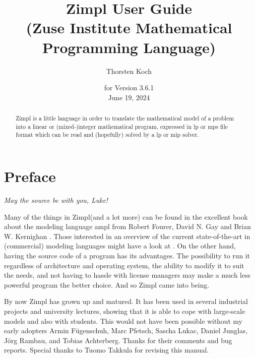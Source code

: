 \documentclass[11pt]{article}
\newcommand{\zimpl}{{\sc Zimpl}\xspace}
\newcommand{\lp}{{\sc lp}\xspace}
\newcommand{\mip}{{\sc mip}\xspace}
\newcommand{\mps}{{\sc mps}\xspace}
\newcommand{\lpf}{{\sc lp}\xspace}
\newcommand{\ampl}{{\sc ampl}\xspace}
\begin{document}

\title{
\LARGE\zimpl User Guide\\
\normalsize (Zuse Institute Mathematical Programming Language)}
\author{Thorsten Koch}
\date{\small for Version 3.6.1\\ June 19, 2024}
\maketitle
%
\tableofcontents
\newpage
\begin{abstract}
  \zimpl is a little language in order to translate the mathematical
  model of a problem into a linear or (mixed-)integer mathematical
  program, expressed in \lpf or \mps file format which can be read and
  (hopefully) solved by a \lp or \mip solver.
\end{abstract}


\section{Preface}
\begin{flushright}
{\em May the source be with you, Luke!}
\end{flushright}
Many of the things in \zimpl (and a lot more) can be found in
the excellent book about the modeling language \ampl
from Robert Fourer, David N. Gay and Brian W. Kernighan
\cite{FourierGayKernighan2003}. Those interested in an overview of the
current state-of-the-art in (commercial) modeling languages might have
a look at \cite{Kallrath2004}.
%
On the other hand, having the source code of a program has its
advantages. The possibility to run it regardless of architecture and
operating system, the ability to modify it to suit the needs, and not
having to hassle with license managers may make a much less powerful
program the better choice.  And so \zimpl came into being.

\bigskip
By now \zimpl has grown up and matured. It has been used in several
industrial projects and university lectures, showing that it is able to
cope with large-scale models and also with students.
This would not have been possible without my early adopters
Armin F\"ugenschuh, Marc Pfetsch, Sascha Lukac, Daniel Junglas, J\"org
Rambau, and Tobias Achterberg. Thanks for their comments and bug
reports. Special thanks to Tuomo Takkula for revising this manual.
\end{document}

